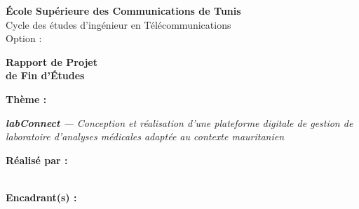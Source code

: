 \documentclass[12pt, a4paper, oneside]{report}
\begin{document}
\begin{titlepage}
  \begin{center}

    \vspace{0.5cm}
    {\large\bfseries École Supérieure des Communications de Tunis}\\[0.4em]
    {\normalsize Cycle des études d'ingénieur en Télécommunications}\\[1.5em]

    {\large Option : \underline{\hspace{6cm}}}\\
    \vspace{2.5cm}

    {\Huge\bfseries\color{supcomblue} Rapport de Projet}\\[0.4em]
    {\Huge\bfseries\color{supcomblue} de Fin d'Études}\\
    \vspace{2cm}

    {\large\bfseries Thème :}\\[0.6em]
    \begin{minipage}{0.85\linewidth}
      \centering\itshape\large
      \textbf{labConnect} — Conception et réalisation d'une plateforme digitale
      de gestion de laboratoire d'analyses médicales adaptée au contexte mauritanien
    \end{minipage}
    \vspace{2cm}

    \begin{minipage}[t]{0.45\linewidth}
      \centering
      \textbf{Réalisé par :}\\[0.4em]
      \underline{\hspace{5cm}}\\
    \end{minipage}%
    \begin{minipage}[t]{0.45\linewidth}
      \centering
      \textbf{Encadrant(s) :}\\[0.4em]
      \underline{\hspace{5cm}}\\
      \underline{\hspace{5cm}}\\
    \end{minipage}
    \vspace{1.5cm}


\end{center}
\end{titlepage}
\end{document}
